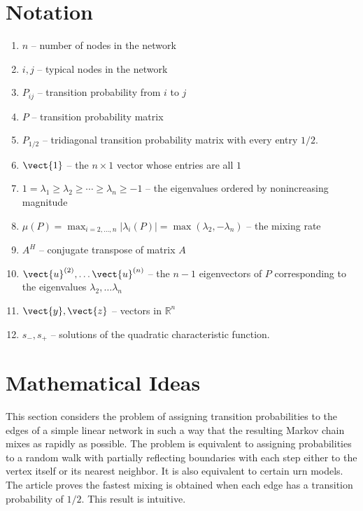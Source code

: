 \documentclass[12pt]{article}
\begin{document}
\hr

\section*{Notation}
\begin{enumerate}
    \item
        \( n \) -- number of nodes in the network
    \item
        \( i, j \) -- typical nodes in the network
    \item
        \( P_{ij} \) -- transition probability from \( i \) to \( j \)
    \item
        \( P \) -- transition probability matrix
    \item
        \( P_{1/2} \) -- tridiagonal transition probability matrix with
        every entry \( 1/2 \).
    \item
        \( \vect{1} \) -- the \( n \times 1 \) vector whose entries are
        all \( 1 \)
    \item
        \( 1 = \lambda_1 \ge \lambda_2 \ge \cdots \ge \lambda_n \ge -1 \)
        -- the eigenvalues ordered by nonincreasing magnitude
    \item
        \( \mu(P) = \max_{i=2,\dots,n} | \lambda_i(P) | = \max(\lambda_2,
        -\lambda_n) \) -- the mixing rate
    \item
        \( A^H \) -- conjugate transpose of matrix \( A \)
    \item
        \( \vect{u}^{(2)}, \dots \vect{u}^{(n)} \) -- the \( n-1 \)
        eigenvectors of \( P \) corresponding to the eigenvalues \(
        \lambda_2, \dots \lambda_n \)
    \item
        \( \vect{y}, \vect{z} \) -- vectors in \( \mathbb{R}^n \)
    \item
        \( s_{-}, s_{+} \) -- solutions of the quadratic characteristic
        function.
\end{enumerate}

\section*{Mathematical Ideas}

This section considers the problem of assigning transition probabilities
to the edges of a simple linear network in such a way that the resulting
Markov chain mixes as rapidly as possible.  The problem is equivalent to
assigning probabilities to a random walk with partially reflecting
boundaries with each step either to the vertex itself or its nearest
neighbor.  It is also equivalent to certain urn models.  The article
proves the fastest mixing is obtained when each edge has a transition
probability of \( 1/2 \).  This result is intuitive.
\end{document}
